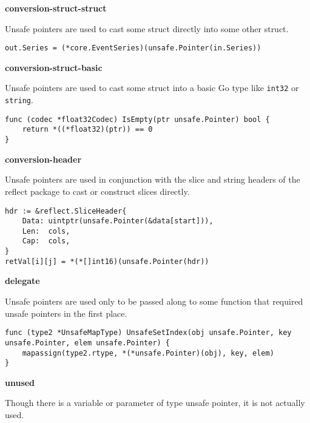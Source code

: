 \textbf{conversion-struct-struct}

Unsafe pointers are used to cast some struct directly into some other struct.

\begin{lstlisting}[language=Golang, label=lst:survey-small-classexample-conversion-struct-struct, caption=Usage class example: conversion-struct-struct]
out.Series = (*core.EventSeries)(unsafe.Pointer(in.Series))
\end{lstlisting}


\textbf{conversion-struct-basic}

Unsafe pointers are used to cast some struct into a basic Go type like \texttt{int32} or \texttt{string}.

\begin{lstlisting}[language=Golang, label=lst:survey-small-classexample-conversion-struct-basic, caption=Usage class example: conversion-struct-basic]
func (codec *float32Codec) IsEmpty(ptr unsafe.Pointer) bool {
    return *((*float32)(ptr)) == 0
}
\end{lstlisting}


\textbf{conversion-header}

Unsafe pointers are used in conjunction with the slice and string headers of the reflect package to cast or construct
slices directly.

\begin{lstlisting}[language=Golang, label=lst:survey-small-classexample-conversion-header, caption=Usage class example: conversion-header]
hdr := &reflect.SliceHeader{
    Data: uintptr(unsafe.Pointer(&data[start])),
    Len:  cols,
    Cap:  cols,
}
retVal[i][j] = *(*[]int16)(unsafe.Pointer(hdr))
\end{lstlisting}


\textbf{delegate}

Unsafe pointers are used only to be passed along to some function that required unsafe pointers in the first place.

\begin{lstlisting}[language=Golang, label=lst:survey-small-classexample-delegate, caption=Usage class example: delegate]
func (type2 *UnsafeMapType) UnsafeSetIndex(obj unsafe.Pointer, key unsafe.Pointer, elem unsafe.Pointer) {
    mapassign(type2.rtype, *(*unsafe.Pointer)(obj), key, elem)
}
\end{lstlisting}


\textbf{unused}

Though there is a variable or parameter of type unsafe pointer, it is not actually used.

